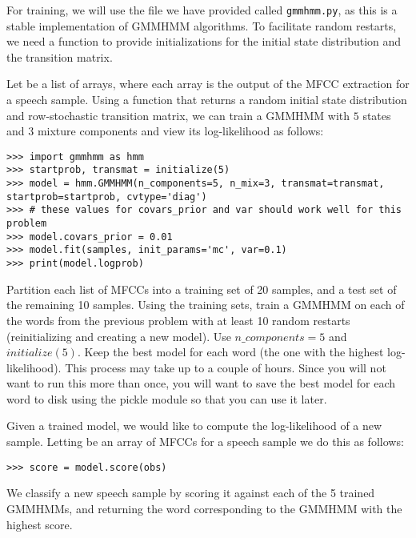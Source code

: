 For training, we will use the file we have provided called {\tt gmmhmm.py}, as this is a stable implementation of GMMHMM algorithms.
To facilitate random restarts, we need a function to provide initializations for the initial state distribution and the transition matrix.

Let  be a list of arrays, where each array is the output of the MFCC extraction for a speech sample.
Using a function  that returns a random initial state distribution and row-stochastic transition matrix, we can train a GMMHMM with $5$ states
and $3$ mixture components and view its log-likelihood as follows:
\begin{lstlisting}
>>> import gmmhmm as hmm
>>> startprob, transmat = initialize(5)
>>> model = hmm.GMMHMM(n_components=5, n_mix=3, transmat=transmat, startprob=startprob, cvtype='diag')
>>> # these values for covars_prior and var should work well for this problem
>>> model.covars_prior = 0.01
>>> model.fit(samples, init_params='mc', var=0.1)
>>> print(model.logprob)
\end{lstlisting}

\begin{problem}
Partition each list of MFCCs into a training set of 20 samples, and a test set of
the remaining 10 samples.
Using the training sets, train a GMMHMM on each of the words from the previous problem
with at least 10 random restarts (reinitializing and creating a new model).
Use $n\_components=5$ and $initialize(5)$.  
Keep the best model for each word (the one with the highest
log-likelihood). 
This process may take up to a couple of hours. 
Since you will not want to run this
more than once, you will want to save the best model for each word to disk using the pickle
module so that you can use it later.

\end{problem}

Given a trained model, we would like to compute the log-likelihood of a new sample.
Letting  be an array of MFCCs for a speech sample we do this as follows:
\begin{lstlisting}
>>> score = model.score(obs)
\end{lstlisting}
We classify a new speech sample by scoring it against each of the 5 trained GMMHMMs, and returning the word corresponding to the GMMHMM with the highest score.



